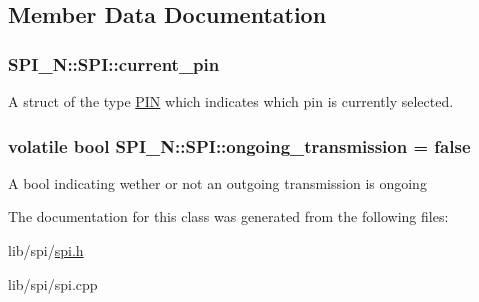 \subsection{Member Data Documentation}
\hypertarget{class_s_p_i___n_1_1_s_p_i_ac016c4eaed2db3f8b5523bf0d472ddd2}{
\subsubsection[{current\-\_\-pin}]{ S\-P\-I\-\_\-\-N\-::\-S\-P\-I\-::current\-\_\-pin\hspace{0.3cm}{\ttfamily [private]}}}\label{class_s_p_i___n_1_1_s_p_i_ac016c4eaed2db3f8b5523bf0d472ddd2}
A struct of the type \hyperlink{struct_s_p_i___n_1_1_p_i_n}{P\-I\-N} which indicates which pin is currently selected. \hypertarget{class_s_p_i___n_1_1_s_p_i_a89115bf64f31cd26d0b6ed3292decabb}{
\subsubsection[{ongoing\-\_\-transmission}]{\setlength{\rightskip}{0pt plus 5cm}volatile bool S\-P\-I\-\_\-\-N\-::\-S\-P\-I\-::ongoing\-\_\-transmission = false\hspace{0.3cm}{\ttfamily [private]}}}\label{class_s_p_i___n_1_1_s_p_i_a89115bf64f31cd26d0b6ed3292decabb}
A bool indicating wether or not an outgoing transmission is ongoing 

The documentation for this class was generated from the following files\-:\begin{DoxyCompactItemize}
\item 
lib/spi/\hyperlink{spi_8h}{spi.\-h}\item 
lib/spi/spi.\-cpp\end{DoxyCompactItemize}
